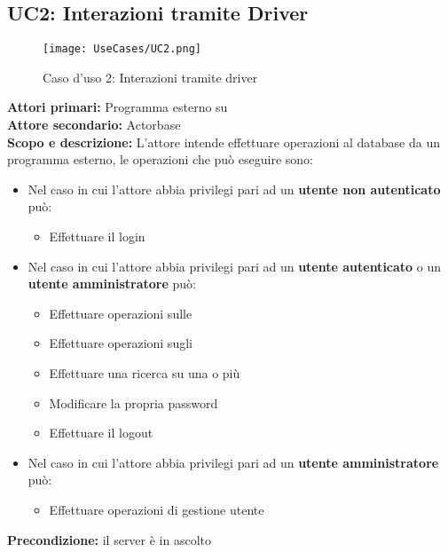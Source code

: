 \documentclass{scalatekids-article}
\begin{document}

\subsection{UC2: Interazioni tramite Driver}
\begin{figure}[H]
  \begin{center}
    \texttt{[image: UseCases/UC2.png]}
    \caption{Caso d'uso 2: Interazioni tramite driver}
  \end{center}
\end{figure}
\textbf{Attori primari:} Programma esterno su \\
\textbf{Attore secondario:} Actorbase\\
\textbf{Scopo e descrizione:} L'attore intende effettuare operazioni al database da un programma  esterno, le operazioni che può eseguire sono:
\begin{itemize}
\item Nel caso in cui l'attore abbia privilegi pari ad un \textbf{utente non autenticato} può:
  \begin{itemize}
  \item Effettuare il login
  \end{itemize}
\item Nel caso in cui l'attore abbia privilegi pari ad un \textbf{utente autenticato} o un \textbf{utente amministratore} può:
  \begin{itemize}
  \item Effettuare operazioni sulle 
  \item Effettuare operazioni sugli 
  \item Effettuare una ricerca su una o più 
  \item Modificare la propria password
  \item Effettuare il logout
  \end{itemize}
\item Nel caso in cui l'attore abbia privilegi pari ad un \textbf{utente amministratore} può:
  \begin{itemize}
  \item Effettuare operazioni di gestione utente
  \end{itemize}
\end{itemize}
\textbf{Precondizione:} il server è in ascolto\\
\end{document}

